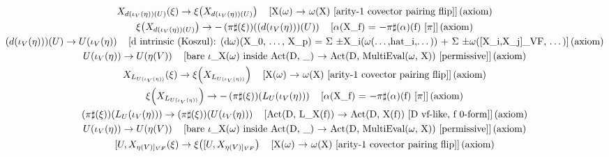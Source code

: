\documentclass[11pt]{article}
\begin{document}
{\begin{gather*}
X_{d(\iota_V(\eta))(U)}\!\left(\xi\right) \to \xi\!\left(X_{d(\iota_V(\eta))(U)}\right) \quad \text{[X(\ensuremath{\omega}) \ensuremath{\to} \ensuremath{\omega}(X)  [arity-1 covector pairing flip]]\,(axiom)} \\
\xi\!\left(X_{d(\iota_V(\eta))(U)}\right) \to -\left(\pi\sharp\!\left(\xi\right)\right)\!\left(\left(d\!\left(\iota_V\!\left(\eta\right)\right)\right)\!\left(U\right)\right) \quad \text{[\ensuremath{\alpha}(X\_f) = \ensuremath{-}\ensuremath{\pi}\ensuremath{\sharp}(\ensuremath{\alpha})(f) [\ensuremath{\pi}]]\,(axiom)} \\
\left(d\!\left(\iota_V\!\left(\eta\right)\right)\right)\!\left(U\right) \to U\!\left(\iota_V\!\left(\eta\right)\right) \quad \text{[d intrinsic (Koszul): (d\ensuremath{\omega})(X\_0, \ensuremath{\dots}, X\_p) = \ensuremath{\Sigma} \ensuremath{\pm}X\_i(\ensuremath{\omega}(\ensuremath{\dots},hat\_i,\ensuremath{\dots})) + \ensuremath{\Sigma} \ensuremath{\pm}\ensuremath{\omega}([X\_i,X\_j]\_VF, \ensuremath{\dots})]\,(axiom)} \\
U\!\left(\iota_V\!\left(\eta\right)\right) \to U\!\left(\eta\!\left(V\right)\right) \quad \text{[bare \ensuremath{\iota}\_X(\ensuremath{\omega}) inside Act(D, \_) \ensuremath{\to} Act(D, MultiEval(\ensuremath{\omega}, X))  [permissive]]\,(axiom)} \\
X_{L_{U(\iota_V(\eta))}}\!\left(\xi\right) \to \xi\!\left(X_{L_{U(\iota_V(\eta))}}\right) \quad \text{[X(\ensuremath{\omega}) \ensuremath{\to} \ensuremath{\omega}(X)  [arity-1 covector pairing flip]]\,(axiom)} \\
\xi\!\left(X_{L_{U(\iota_V(\eta))}}\right) \to -\left(\pi\sharp\!\left(\xi\right)\right)\!\left(L_U\!\left(\iota_V\!\left(\eta\right)\right)\right) \quad \text{[\ensuremath{\alpha}(X\_f) = \ensuremath{-}\ensuremath{\pi}\ensuremath{\sharp}(\ensuremath{\alpha})(f) [\ensuremath{\pi}]]\,(axiom)} \\
\left(\pi\sharp\!\left(\xi\right)\right)\!\left(L_U\!\left(\iota_V\!\left(\eta\right)\right)\right) \to \left(\pi\sharp\!\left(\xi\right)\right)\!\left(U\!\left(\iota_V\!\left(\eta\right)\right)\right) \quad \text{[Act(D, L\_X(f)) \ensuremath{\to} Act(D, X(f))  [D vf-like, f 0-form]]\,(axiom)} \\
U\!\left(\iota_V\!\left(\eta\right)\right) \to U\!\left(\eta\!\left(V\right)\right) \quad \text{[bare \ensuremath{\iota}\_X(\ensuremath{\omega}) inside Act(D, \_) \ensuremath{\to} Act(D, MultiEval(\ensuremath{\omega}, X))  [permissive]]\,(axiom)} \\
[U,X_{\eta(V)]_{VF}}\!\left(\xi\right) \to \xi\!\left([U,X_{\eta(V)]_{VF}}\right) \quad \text{[X(\ensuremath{\omega}) \ensuremath{\to} \ensuremath{\omega}(X)  [arity-1 covector pairing flip]]\,(axiom)} \\

\end{gather*}}
\end{document}
